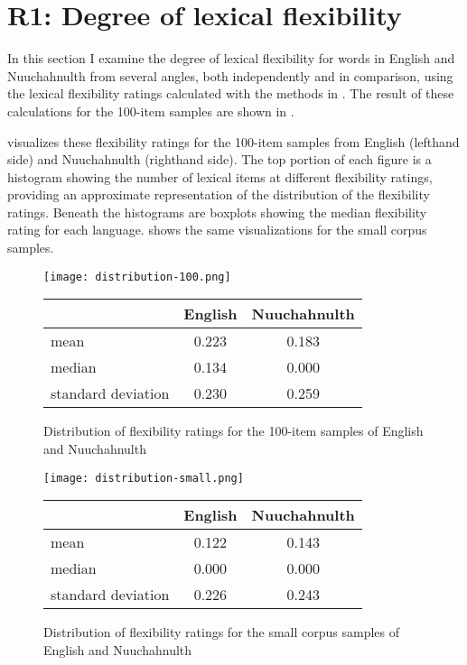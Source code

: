 \section{R1: Degree of lexical flexibility}
\label{sec:4.3}

In this section I examine the degree of lexical flexibility for words in English and Nuuchahnulth from several angles, both independently and in comparison, using the lexical flexibility ratings calculated with the methods in . The result of these calculations for the 100-item samples are shown in .

 visualizes these flexibility ratings for the 100-item samples from English (lefthand side) and Nuuchahnulth (righthand side). The top portion of each figure is a histogram showing the number of lexical items at different flexibility ratings, providing an approximate representation of the distribution of the flexibility ratings. Beneath the histograms are boxplots showing the median flexibility rating for each language.  shows the same visualizations for the small corpus samples.

\begin{figure}

  \centering
  \caption{Distribution of flexibility ratings for the 100-item samples of English and Nuuchahnulth}
  \label{fig:histogram-100-items}

  \texttt{[image: distribution-100.png]}

  \begin{tabular}{ l c c }
    \toprule
    { }                & English & Nuuchahnulth\\
    \midrule
    mean               & 0.223   & 0.183       \\
    median             & 0.134   & 0.000       \\
    standard deviation & 0.230   & 0.259       \\
    \bottomrule
  \end{tabular}

\end{figure}

\begin{figure}

  \centering
  \caption{Distribution of flexibility ratings for the small corpus samples of English and Nuuchahnulth}
  \label{fig:histogram-small-corpus}

  \texttt{[image: distribution-small.png]}

  \begin{tabular}{ l c c }
    \toprule
    { }                & English & Nuuchahnulth\\
    \midrule
    mean               & 0.122   & 0.143       \\
    median             & 0.000   & 0.000       \\
    standard deviation & 0.226   & 0.243       \\
    \bottomrule
  \end{tabular}

\end{figure}

